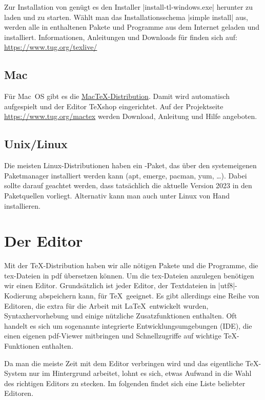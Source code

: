 \documentclass[
	ausgabe=2024-02-12,
	titel=Installationshinweise,
	shortverb=true,
]{../tex/latexkurs-exercise}
\begin{document}
Zur Installation von \TeXlive genügt es den Installer |install-tl-windows.exe| herunter zu laden und zu starten. Wählt man das Installationsschema |simple install| aus, werden alle in \TeXlive enthaltenen Pakete und Programme aus dem Internet geladen und installiert. Informationen, Anleitungen und Downloads für \TeXlive finden sich auf:\\ \url{https://www.tug.org/texlive/}


\subsection*{Mac}
Für Mac~OS gibt es die \href{https://www.tug.org/mactex}{Mac\TeX-Distribution}. Damit wird automatisch  \TeXlive aufgespielt und  der Editor \TeX shop eingerichtet. Auf der Projektseite \url{https://www.tug.org/mactex} werden Download, Anleitung und Hilfe angeboten.

\subsection*{Unix/Linux}
Die meisten Linux-Distributionen haben ein \TeXlive-Paket, das über den systemeigenen Paketmanager installiert werden kann (apt, emerge, pacman, yum, …).
Dabei sollte darauf geachtet werden, dass tatsächlich die aktuelle Version 2023 in den Paketquellen vorliegt. Alternativ kann man \TeXlive auch unter Linux von Hand installieren.



\section{Der Editor}

Mit der \TeX-Distribution haben wir alle nötigen Pakete und die Programme, die tex-Dateien in pdf übersetzen können. Um die tex-Dateien anzulegen benötigen wir einen Editor. Grundsätzlich ist jeder Editor, der Textdateien in |utf8|-Kodierung abspeichern kann, für \TeX\ geeignet. Es gibt allerdings eine Reihe von Editoren, die extra für die Arbeit mit \LaTeX\ entwickelt wurden, Syntaxhervorhebung und einige nützliche Zusatzfunktionen enthalten. Oft handelt es sich um sogenannte integrierte Entwicklungsumgebungen (IDE), die einen eigenen pdf-Viewer mitbringen und Schnellzugriffe auf wichtige \TeX-Funktionen enthalten.

Da man die meiste Zeit mit dem Editor verbringen wird und das eigentliche \TeX-System nur im Hintergrund arbeitet, lohnt es sich, etwas Aufwand in die Wahl des richtigen Editors zu stecken. Im folgenden findet sich eine Liste beliebter Editoren.
\end{document}

